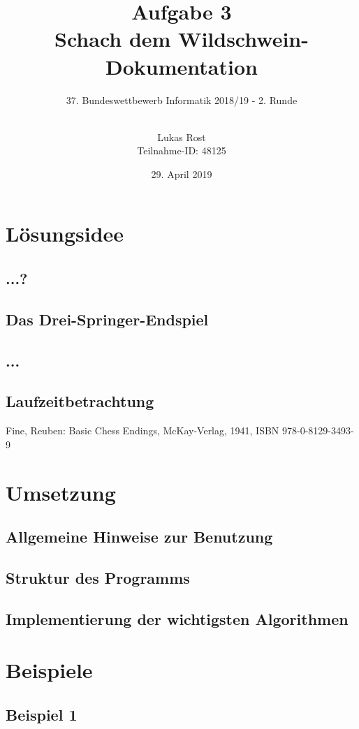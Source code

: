 \documentclass[a4paper, notitlepage, 12pt]{scrartcl}
\author{Lukas Rost \\ \small{Teilnahme-ID: 48125}}
\title{Aufgabe 3 \\ \glqq Schach dem Wildschwein\grqq  - Dokumentation}
\subtitle{37. Bundeswettbewerb Informatik 2018/19 - 2. Runde \\~\\}
\date{29. April 2019}
\begin{document}
\renewcommand{\contentsname}{\centerline{Inhaltsverzeichnis}}
 \maketitle
 \tableofcontents
 \thispagestyle{empty}
 \newpage
 \setcounter{page}{1}
 
 \section{Lösungsidee}
 \subsection{...?}
 \subsection{Das Drei-Springer-Endspiel}
 \subsection{...}
 \subsection{Laufzeitbetrachtung}
\begin{thebibliography}{xx}
 Fine, Reuben: Basic Chess Endings, McKay-Verlag, 1941, ISBN 978-0-8129-3493-9
\end{thebibliography}

\section{Umsetzung}
\subsection{Allgemeine Hinweise zur Benutzung}
\subsection{Struktur des Programms}
\subsection{Implementierung der wichtigsten Algorithmen}

\section{Beispiele}
\subsection{Beispiel 1}
\end{document}
